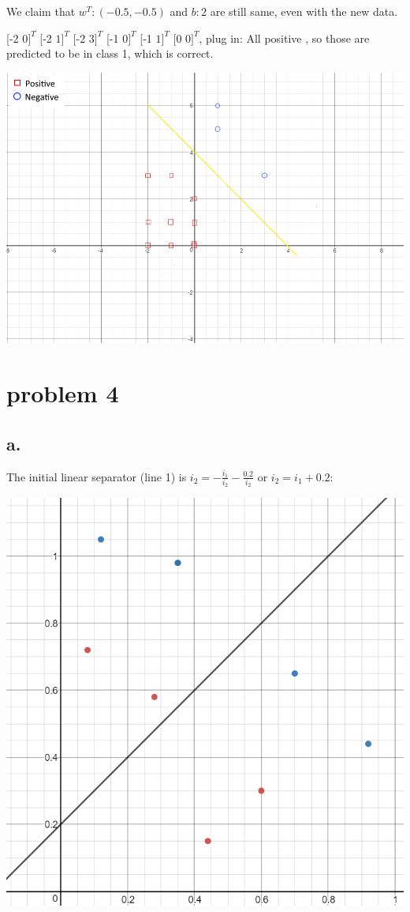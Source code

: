 \documentclass[12pt, letterpaper]{article}
\begin{document}
	We claim that $w^{T}:(-0.5,-0.5)$ and $b:2$ are still same, even with the new data. 
	
	[-2 $0]^{T}$ [-2 $1]^{T}$ [-2 $3]^{T}$ [-1 $0]^{T}$ [-1 $1]^{T}$ [0 $0]^{T}$, plug in:
	All positive , so those are predicted to be in class 1, which is correct.
	
	\includegraphics[scale=0.6]{"problem-3-c"}
	
	
	\pagebreak
	\section{problem 4}
	\subsection{a.}
	The initial linear separator (line 1) is $i_2 = -\frac{i_1}{i_2} - \frac{0.2}{i_2}$ or $i_2 = i_1 + 0.2$:
	\medskip
	
	\includegraphics[scale=0.6]{"Problem 4/Initial Linear Separator"}
	
\end{document}
